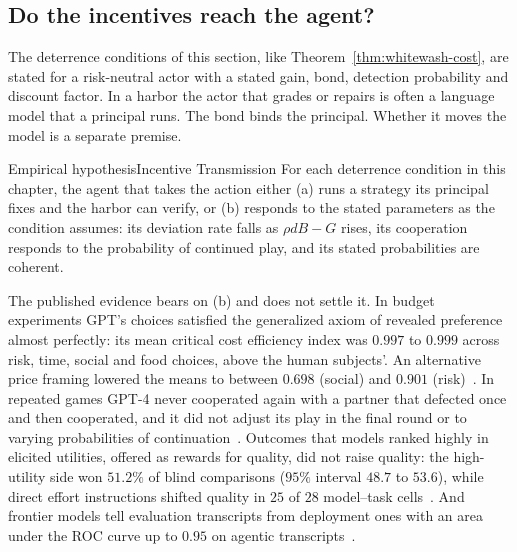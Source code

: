 \subsection{Do the incentives reach the agent?}\label{sec:stp-transmission}

The deterrence conditions of this section, like
Theorem~\ref{thm:whitewash-cost}, are stated for a risk-neutral actor with a
stated gain, bond, detection probability and discount factor. In a harbor the
actor that grades or repairs is often a language model that a principal runs.
The bond binds the principal. Whether it moves the model is a separate
premise.

\begin{pdclaim}{Empirical hypothesis}{Incentive Transmission}
\setlength{\parskip}{4pt plus 1pt}
\label{hyp:stp-transmission}
For each deterrence condition in this chapter, the agent that takes the
action either (a) runs a strategy its principal fixes and the harbor can
verify, or (b) responds to the stated parameters as the condition assumes:
its deviation rate falls as $\rho dB-G$ rises, its cooperation responds to the
probability of continued play, and its stated probabilities are coherent.
\end{pdclaim}

The published evidence bears on (b) and does not settle it. In budget
experiments GPT's choices satisfied the generalized axiom of revealed
preference almost perfectly: its mean critical cost efficiency index was
$0.997$ to $0.999$ across risk, time, social and food choices, above the human
subjects'. An alternative price framing lowered the means to between $0.698$
(social) and $0.901$ (risk)~. In repeated games
GPT-4 never cooperated again with a partner that defected once and then
cooperated, and it did not adjust its play in the final round or to varying
probabilities of continuation~. Outcomes that models
ranked highly in elicited utilities, offered as rewards for quality, did not
raise quality: the high-utility side won $51.2\%$ of blind comparisons
($95\%$ interval $48.7$ to $53.6$), while direct effort instructions shifted
quality in $25$ of $28$ model--task cells~.
And frontier models tell evaluation transcripts from deployment ones with an
area under the ROC curve up to $0.95$ on agentic
transcripts~.

